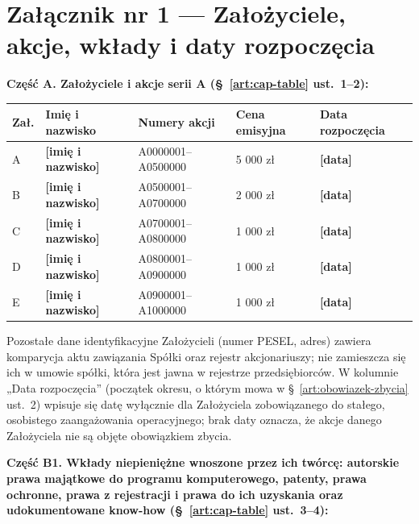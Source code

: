\documentclass[12pt,a4paper]{report}
\newcommand{\field}[1]{\textbf{[#1]}}
\begin{document}
\newpage

\section*{Załącznik nr 1 — Założyciele, akcje, wkłady i daty rozpoczęcia}

\textbf{Część A. Założyciele i akcje serii A (§~\ref{art:cap-table} ust.~1--2):}

\begin{center}
\begin{tabularx}{\linewidth}{@{}p{0.9cm} >{\raggedright\arraybackslash}X p{4.2cm} p{1.9cm} p{2.3cm}@{}}
\toprule
\textbf{Zał.} & \textbf{Imię i nazwisko} & \textbf{Numery akcji} & \textbf{Cena emisyjna} & \textbf{Data rozpoczęcia} \\
\midrule
A & \field{imię i nazwisko} & A0000001--A0500000 & 5 000 zł & \field{data} \\
B & \field{imię i nazwisko} & A0500001--A0700000 & 2 000 zł & \field{data} \\
C & \field{imię i nazwisko} & A0700001--A0800000 & 1 000 zł & \field{data} \\
D & \field{imię i nazwisko} & A0800001--A0900000 & 1 000 zł & \field{data} \\
E & \field{imię i nazwisko} & A0900001--A1000000 & 1 000 zł & \field{data} \\
\bottomrule
\end{tabularx}
\end{center}

Pozostałe dane identyfikacyjne Założycieli (numer PESEL, adres) zawiera komparycja aktu zawiązania Spółki oraz rejestr akcjonariuszy; nie zamieszcza się ich w umowie spółki, która jest jawna w rejestrze przedsiębiorców. W kolumnie „Data rozpoczęcia” (początek okresu, o którym mowa w §~\ref{art:obowiazek-zbycia} ust.~2) wpisuje się datę wyłącznie dla Założyciela zobowiązanego do stałego, osobistego zaangażowania operacyjnego; brak daty oznacza, że akcje danego Założyciela nie są objęte obowiązkiem zbycia.

\textbf{Część B1. Wkłady niepieniężne wnoszone przez ich twórcę: autorskie prawa majątkowe do programu komputerowego, patenty, prawa ochronne, prawa z rejestracji i prawa do ich uzyskania oraz udokumentowane know-how (§~\ref{art:cap-table} ust.~3--4):}
\end{document}
